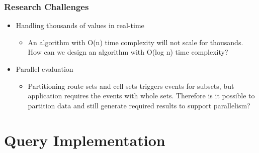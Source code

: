 \documentclass{beamer}
\begin{document}
\begin{frame}
\frametitle{Research Challenges}
\begin{itemize}
	\item Handling thousands of values in real-time
		\begin{itemize}
			\item An algorithm with O(n) time complexity will not scale for thousands. How can we design an algorithm with O(log n) time complexity?
		\end{itemize}
	\item Parallel evaluation
		\begin{itemize}
                        \item Partitioning route sets and cell sets triggers events for subsets, but application requires the events with whole sets. Therefore is it possible to partition data and still generate required results to support parallelism? 
                \end{itemize}
\end{itemize}

\end{frame}


\section{Query Implementation}
\end{document}
